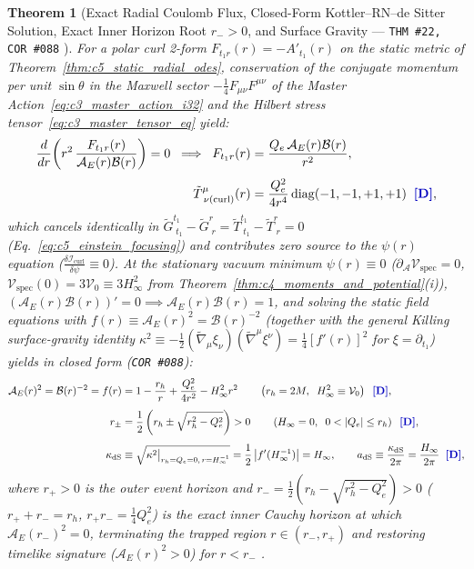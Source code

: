 \documentclass[11pt,a4paper]{article}
\newcommand{\catD}{\text{\textbf{\textcolor{blue!75!black}{[D]}}}}
\theoremstyle{definition}
\theoremstyle{plain}
\newtheorem{theorem}[axiom]{Theorem}
\theoremstyle{remark}
\begin{document}
\begin{theorem}[{Exact Radial Coulomb Flux, Closed-Form Kottler--RN--de Sitter Solution, Exact Inner Horizon Root $r_- > 0$, and Surface Gravity --- \texttt{THM~\#22, COR~\#088} \catD}]\label{thm:c5_electro_vacuum}\label{thm:c5_electrovacuum_desitter_odes}
For a polar curl 2-form $F_{t_1 r}(r) = -A'_{t_1}(r)$ on the static metric of Theorem~\ref{thm:c5_static_radial_odes}, conservation of the conjugate momentum per unit $\sin\theta$ in the Maxwell sector $-\frac{1}{4}F_{\mu\nu}F^{\mu\nu}$ of the Master Action~\eqref{eq:c3_master_action_i32} and the Hilbert stress tensor~\eqref{eq:c3_master_tensor_eq} yield:
\begin{align}
\frac{d}{dr}\!\left(r^2\,\frac{F_{t_1 r}(r)}{\mathcal{A}_E(r)\mathcal{B}(r)}\right) = 0 \;\;\Longrightarrow\;\; F_{t_1 r}(r) &= \frac{Q_e\,\mathcal{A}_E(r)\mathcal{B}(r)}{r^2}, \nonumber \\[3pt]
\tilde{T}^\mu_{\;\nu(\mathrm{curl})}(r) &= \frac{Q_e^2}{4r^4}\,\mathrm{diag}(-1, -1, +1, +1) \;\;\catD, \label{eq:c5_coulomb_flux}
\end{align}
which cancels identically in $\tilde{G}^{t_1}_{\;t_1} - \tilde{G}^r_{\;r} = \tilde{T}^{t_1}_{\;t_1} - \tilde{T}^r_{\;r} = 0$ (Eq.~\eqref{eq:c5_einstein_focusing}) and contributes zero source to the $\psi(r)$ equation ($\frac{\delta\mathcal{I}_{\mathrm{curl}}}{\delta\psi} \equiv 0$). At the stationary vacuum minimum $\psi(r) \equiv 0$ ($\partial_{\mathcal{A}}\mathcal{V}_{\mathrm{spec}} = 0$, $\mathcal{V}_{\mathrm{spec}}(0) = 3\mathcal{V}_0 \equiv 3H_\infty^2$ from Theorem~\ref{thm:c4_moments_and_potential}(i)), $(\mathcal{A}_E(r)\mathcal{B}(r))' = 0 \implies \mathcal{A}_E(r)\mathcal{B}(r) = 1$, and solving the static field equations with $f(r) \equiv \mathcal{A}_E(r)^2 = \mathcal{B}(r)^{-2}$ (together with the general Killing surface-gravity identity $\kappa^2 \equiv -\frac{1}{2}(\tilde{\nabla}_\mu\xi_\nu)(\tilde{\nabla}^\mu\xi^\nu) = \frac{1}{4}[f'(r)]^2$ for $\xi = \partial_{t_1}$) yields in closed form (\texttt{COR~\#088}):
\begin{align}
\mathcal{A}_E(r)^2 = \mathcal{B}(r)^{-2} = f(r) &= 1 - \frac{r_h}{r} + \frac{Q_e^2}{4r^2} - H_\infty^2 r^2 \qquad \left(r_h = 2M, \;\; H_\infty^2 \equiv \mathcal{V}_0\right) \;\;\catD, \label{eq:c5_kottler_solution} \\[4pt]
r_\pm &= \frac{1}{2}\left(r_h \pm \sqrt{r_h^2 - Q_e^2}\right) > 0 \qquad \left(H_\infty = 0, \;\; 0 < |Q_e| \le r_h\right) \;\;\catD, \nonumber \\[4pt]
\kappa_{\mathrm{dS}} &\equiv \sqrt{\kappa^2\big|_{r_h=Q_e=0,\, r=H_\infty^{-1}}} = \frac{1}{2}\left|f'(H_\infty^{-1})\right| = H_\infty, \qquad
a_{\mathrm{dS}} \equiv \frac{\kappa_{\mathrm{dS}}}{2\pi} = \frac{H_\infty}{2\pi} \;\;\catD, \label{eq:c5_inner_cauchy_horizon}
\end{align}
where $r_+ > 0$ is the outer event horizon and $r_- = \frac{1}{2}\left(r_h - \sqrt{r_h^2 - Q_e^2}\right) > 0$ ($r_+ + r_- = r_h$, $r_+ r_- = \frac{1}{4}Q_e^2$) is the exact inner Cauchy horizon at which $\mathcal{A}_E(r_-)^2 = 0$, terminating the trapped region $r \in (r_-, r_+)$ and restoring timelike signature ($\mathcal{A}_E(r)^2 > 0$) for $r < r_-$ \catD.
\end{theorem}
\end{document}
